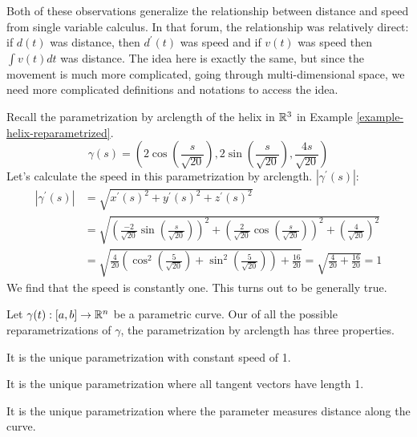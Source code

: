 \documentclass[fleqn,letterpaper]{report}
\begin{document}
Both of these observations generalize the relationship between
distance and speed from single variable calculus. In that
forum, the relationship was relatively direct: if $d(t)$ was
distance, then $d^\prime(t)$ was speed and if $v(t)$ was speed
then $\int v(t) dt$ was distance. The idea here is exactly the
same, but since the movement is much more complicated, going
through multi-dimensional space, we need more complicated
definitions and notations to access the idea.

\begin{example} 
Recall the parametrization by arclength of the helix in
$\mathbb{R}^3$ in Example \ref{example-helix-reparametrized}.
\begin{equation*}
\gamma(s) = \left( 2 \cos \left( \frac{s}{\sqrt{20}} \right),
2 \sin \left( \frac{s}{\sqrt{20}} \right),
\frac{4s}{\sqrt{20}} \right) 
\end{equation*}
Let's calculate the speed in this parametrization by
arclength. 
$|\gamma^\prime(s)|$:
\begin{align*}
|\gamma^\prime(s)| & = \sqrt{ x^\prime(s)^2 + y^\prime(s)^2 +
z^\prime(s)^2} \\
& = \sqrt{ \left( \frac{-2}{\sqrt{20}} \sin \left(
\frac{s}{\sqrt{20}} \right) \right)^2 + \left( \frac{2}{\sqrt{20}} 
\cos \left( \frac{s}{\sqrt{20}} \right) \right)^2
+ \left( \frac{4}{\sqrt{20}} \right)^2} \\
& = \sqrt{\frac{4}{20} \left( \cos^2 \left(
\frac{5}{\sqrt{20}} \right) + \sin^2 \left( \frac{5}{\sqrt{20}}
\right) \right) + \frac{16}{20} } = \sqrt{ \frac{4}{20} +
\frac{16}{20}} = 1
\end{align*}
We find that the speed is constantly one. This turns out to be
generally true.
\end{example}

\begin{prop}
Let $\gamma(t): [a,b] \rightarrow \mathbb{R}^n$ be a parametric
curve. Our of all the possible reparametrizations of $\gamma$,
the parametrization by arclength has three properties.
\begin{smallitemize}
\item It is the unique parametrization with constant speed of 1.
\item It is the unique parametrization where all tangent vectors
have length 1.
\item It is the unique parametrization where the parameter
measures distance along the curve.
\end{smallitemize}
\end{prop}
\end{document}
